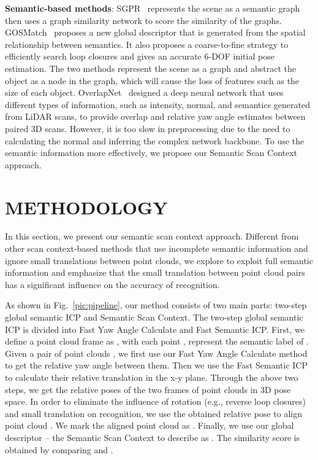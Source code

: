 \documentclass[letterpaper, 10 pt, conference]{ieeeconf}
\begin{document}
\textbf{Semantic-based methods}: SGPR~\cite{SGPR} represents the scene as a semantic graph then uses a graph similarity network to score the similarity of the graphs. GOSMatch~\cite{gosmatch} proposes a new global descriptor that is generated from the spatial relationship between semantics. It also proposes a coarse-to-fine strategy to efficiently search loop closures and gives an accurate 6-DOF initial pose estimation. The two methods represent the scene as a graph and abstract the object as a node in the graph, which will cause the loss of features such as the size of each object. OverlapNet~\cite{ON} designed a deep neural network that uses different types of information, such as intensity, normal, and semantics generated from LiDAR scans, to provide overlap and relative yaw angle estimates between paired 3D scans. However, it is too slow in preprocessing due to the need to calculating the normal and inferring the complex network backbone. To use the semantic information more effectively, we propose our Semantic Scan Context approach.



\section{METHODOLOGY}

In this section, we present our semantic scan context approach. Different from other scan context-based methods that use incomplete semantic information and ignore small translations between point clouds, we explore to exploit full semantic information and emphasize that the small translation between point cloud pairs has a significant influence on the accuracy of recognition.


As shown in Fig.~\ref{pic:pipeline}, our method consists of two main parts: two-step global semantic ICP and Semantic Scan Context. The two-step global semantic ICP is divided into Fast Yaw Angle Calculate and Fast Semantic ICP. First, we define a point cloud frame as , with each point ,  represent the semantic label of . Given a pair of point clouds , we first use our Fast Yaw Angle Calculate method to get the relative yaw angle  between them. Then we use the Fast Semantic ICP to calculate their relative translation  in the x-y plane. Through the above two steps, we get the relative poses  of the two frames of point clouds in 3D pose space. In order to eliminate the influence of rotation (e.g., reverse loop closures) and small translation on recognition, we use the obtained relative pose to align point cloud . We mark the aligned point cloud as . Finally, we use our global descriptor -- the Semantic Scan Context to describe  as . The similarity score is obtained by comparing  and .
\end{document}

